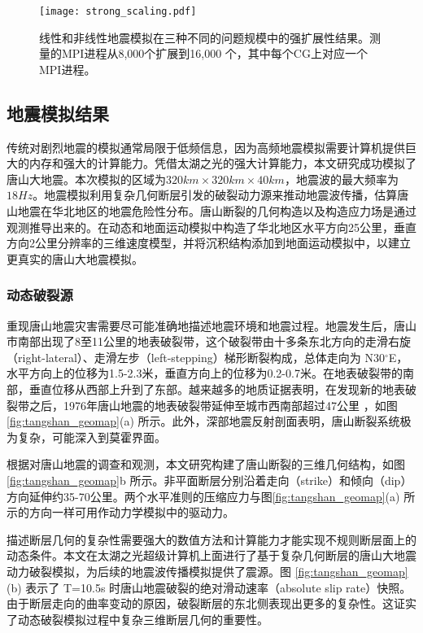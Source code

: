 \begin{figure}[ht]
\centering
\texttt{[image: strong\_scaling.pdf]}
\caption{线性和非线性地震模拟在三种不同的问题规模中的强扩展性结果。测量的MPI进程从8,000个扩展到16,000 个，其中每个CG上对应一个MPI进程。}
\label{fig:strong-scaling}
\end{figure}


\subsection{地震模拟结果}

传统对剧烈地震的模拟通常局限于低频信息，因为高频地震模拟需要计算机提供巨大的内存和强大的计算能力。凭借太湖之光的强大计算能力，本文研究成功模拟了唐山大地震。本次模拟的区域为$320km \times 320km \times 40km$，地震波的最大频率为$18Hz$。地震模拟利用复杂几何断层引发的破裂动力源来推动地震波传播，估算唐山地震在华北地区的地震危险性分布。唐山断裂的几何构造以及构造应力场是通过观测推导出来的。在动态和地面运动模拟中构造了华北地区水平方向25公里，垂直方向2公里分辨率的三维速度模型，并将沉积结构添加到地面运动模拟中，以建立更真实的唐山大地震模拟。

\subsubsection{动态破裂源}

重现唐山地震灾害需要尽可能准确地描述地震环境和地震过程。地震发生后，唐山市南部出现了8至11公里的地表破裂带，这个破裂带由十多条东北方向的走滑右旋（right-lateral）、走滑左步（left-stepping）梯形断裂构成，总体走向为 N30$^\circ$E，水平方向上的位移为1.5-2.3米，垂直方向上的位移为0.2-0.7米。在地表破裂带的南部，垂直位移从西部上升到了东部。越来越多的地质证据表明，在发现新的地表破裂带\citep {Qiu_discovery_2005}之后，1976年唐山地震的地表破裂带延伸至城市西南部超过47公里 \citep{guo_new_2011}，如图\ref{fig:tangshan_geomap}(a) 所示。此外，深部地震反射剖面表明，唐山断裂系统极为复杂，可能深入到莫霍界面\citep{liu_seismogenic_2007}。

根据对唐山地震的调查和观测，本文研究构建了唐山断裂的三维几何结构，如图\ref{fig:tangshan_geomap}b 所示。非平面断层分别沿着走向（strike）和倾向（dip）方向延伸约35-70公里。两个水平准则的压缩应力与图\ref{fig:tangshan_geomap}(a) 所示的方向一样可用作动力学模拟中的驱动力。

描述断层几何的复杂性需要强大的数值方法和计算能力才能实现不规则断层面上的动态条件。本文在太湖之光超级计算机上面进行了基于复杂几何断层的唐山大地震动力破裂模拟，为后续的地震波传播模拟提供了震源。图 \ref{fig:tangshan_geomap}(b) 表示了 T=10.5s 时唐山地震破裂的绝对滑动速率（absolute slip rate）快照。由于断层走向的曲率变动的原因，破裂断层的东北侧表现出更多的复杂性。这证实了动态破裂模拟过程中复杂三维断层几何的重要性。


